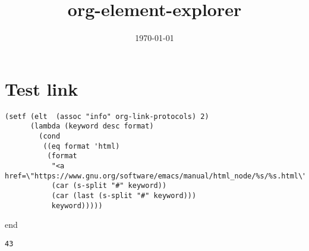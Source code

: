 \documentclass[11pt]{article}
\date{\today}
\title{org-element-explorer}
\begin{document}
\section{Test link}
\label{sec-1}

\begin{verbatim}
(setf (elt  (assoc "info" org-link-protocols) 2)
      (lambda (keyword desc format)
        (cond
         ((eq format 'html)
          (format
           "<a href=\"https://www.gnu.org/software/emacs/manual/html_node/%s/%s.html\">%s</a>"
           (car (s-split "#" keyword))
           (car (last (s-split "#" keyword)))
           keyword)))))
\end{verbatim}





end

\texttt{43}
\end{document}
